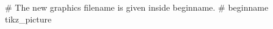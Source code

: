 \documentclass{article}
\begin{document}
{# The new graphics filename is given inside beginname. #}
{{ beginname }}
{{ tikz_picture }}
\endpgfgraphicnamed
\end{document}
